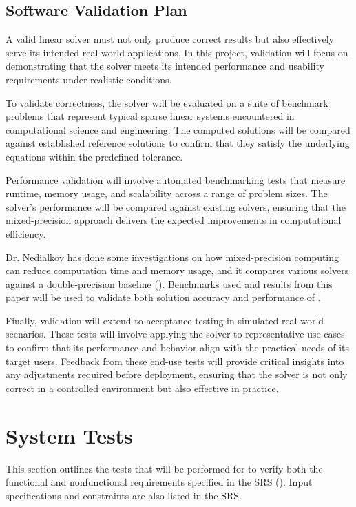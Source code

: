 \documentclass[12pt, titlepage]{article}
\begin{document}
\subsection{Software Validation Plan}

A valid linear solver must not only produce correct results but also effectively
serve its intended real-world applications. In this project, validation will
focus on demonstrating that the solver meets its intended performance and
usability requirements under realistic conditions.

To validate correctness, the solver will be evaluated on a suite of benchmark
problems that represent typical sparse linear systems encountered in
computational science and engineering. The computed solutions will be compared
against established reference solutions to confirm that they satisfy the
underlying equations within the predefined tolerance.

Performance validation will involve automated benchmarking tests that measure
runtime, memory usage, and scalability across a range of problem sizes. The
solver's performance will be compared against existing solvers, ensuring that
the mixed-precision approach delivers the expected improvements in computational
efficiency.

Dr. Nedialkov has done some investigations on how mixed-precision computing can
reduce computation time and memory usage, and it compares various solvers
against a double-precision baseline (\cite{bassi_investigating_2022}).
Benchmarks used and results from this paper will be used to validate both
solution accuracy and performance of \progname{}.

Finally, validation will extend to acceptance testing in simulated real-world
scenarios. These tests will involve applying the solver to representative use
cases to confirm that its performance and behavior align with the practical
needs of its target users. Feedback from these end-use tests will provide
critical insights into any adjustments required before deployment, ensuring that
the solver is not only correct in a controlled environment but also effective in
practice.

\section{System Tests}
\label{sec:system-tests}

This section outlines the tests that will be performed for \progname{} to verify
both the functional and nonfunctional requirements specified in the SRS
(\cite{SRS}). Input specifications and constraints are also listed in the SRS.
\end{document}
